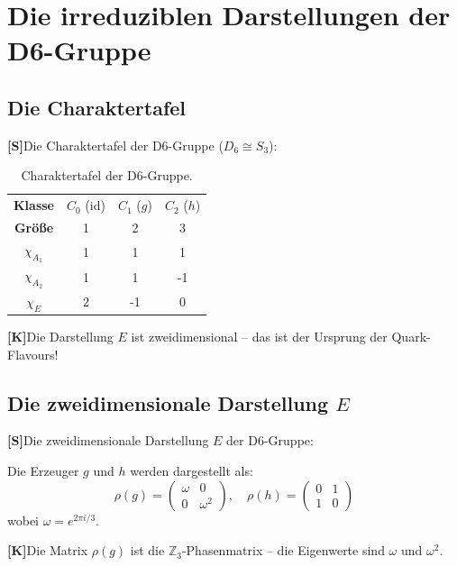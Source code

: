 \documentclass[11pt,a4paper]{article}
\newcommand{\Kstatus}{\textbf{[K]}}
\newcommand{\Sstatus}{\textbf{[S]}}
\begin{document}
	\section{Die irreduziblen Darstellungen der D6-Gruppe}
	
	\subsection{Die Charaktertafel}
	
	\Sstatus Die Charaktertafel der D6-Gruppe ($D_6 \cong S_3$):
	
	\begin{table}[h!]
		\centering
		\caption{Charaktertafel der D6-Gruppe.}
		\label{tab:d6_characters}
		\begin{tabular}{c c c c}
			\toprule
			\textbf{Klasse} & $C_0$ (id) & $C_1$ ($g$) & $C_2$ ($h$) \\
			\textbf{Größe} & 1 & 2 & 3 \\
			\midrule
			$\chi_{A_1}$ & 1 & 1 & 1 \\
			$\chi_{A_2}$ & 1 & 1 & -1 \\
			$\chi_E$ & 2 & -1 & 0 \\
			\bottomrule
		\end{tabular}
	\end{table}
	
	\Kstatus Die Darstellung $E$ ist zweidimensional -- das ist der Ursprung der Quark-Flavours!
	
	\subsection{Die zweidimensionale Darstellung $E$}
	
	\Sstatus Die zweidimensionale Darstellung $E$ der D6-Gruppe:
	
	Die Erzeuger $g$ und $h$ werden dargestellt als:
	\begin{equation}
		\rho(g) = \begin{pmatrix} \omega & 0 \\ 0 & \omega^2 \end{pmatrix}, \quad
		\rho(h) = \begin{pmatrix} 0 & 1 \\ 1 & 0 \end{pmatrix}
	\end{equation}
	wobei $\omega = e^{2\pi i/3}$.
	
	\Kstatus Die Matrix $\rho(g)$ ist die $\mathbb{Z}_3$-Phasenmatrix -- die Eigenwerte sind $\omega$ und $\omega^2$.
	
\end{document}
